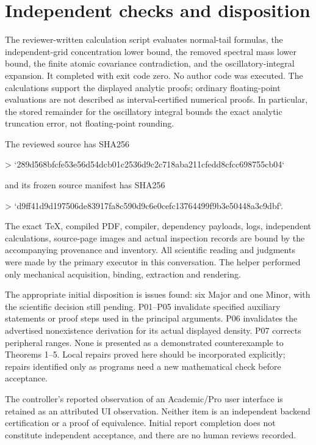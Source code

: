 \documentclass[10pt]{article}
\begin{document}
\section*{Independent checks and disposition}
The reviewer-written calculation script evaluates normal-tail formulas, the independent-grid concentration lower bound, the removed spectral mass lower bound, the finite atomic covariance contradiction, and the oscillatory-integral expansion. It completed with exit code zero. No author code was executed. The calculations support the displayed analytic proofs; ordinary floating-point evaluations are not described as interval-certified numerical proofs. In particular, the stored remainder for the oscillatory integral bounds the exact analytic truncation error, not floating-point rounding.\par
The reviewed source has SHA256\par
> `289d568bfcfe53e56d54dcb01c2536d9c2c718aba211cfedd8cfcc698755cb04`\par
and its frozen source manifest has SHA256\par
> `d9ff41d9d197506de83917fa8c590d9c6e0cefc13764499f9b3e50448a3c9dbf`.\par
The exact TeX, compiled PDF, compiler, dependency payloads, logs, independent calculations, source-page images and actual inspection records are bound by the accompanying provenance and inventory. All scientific reading and judgments were made by the primary executor in this conversation. The helper performed only mechanical acquisition, binding, extraction and rendering.\par
The appropriate initial disposition is issues found: six Major and one Minor, with the scientific decision still pending. P01–P05 invalidate specified auxiliary statements or proof steps used in the principal arguments. P06 invalidates the advertised nonexistence derivation for its actual displayed density. P07 corrects peripheral ranges. None is presented as a demonstrated counterexample to Theorems 1–5. Local repairs proved here should be incorporated explicitly; repairs identified only as programs need a new mathematical check before acceptance.\par
The controller’s reported observation of an Academic/Pro user interface is retained as an attributed UI observation. Neither item is an independent backend certification or a proof of equivalence. Initial report completion does not constitute independent acceptance, and there are no human reviews recorded.\par
\end{document}
